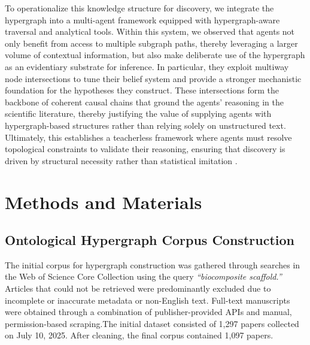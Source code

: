 \documentclass{article}
\begin{document}
To operationalize this knowledge structure for discovery, we integrate the hypergraph into a multi-agent framework equipped with hypergraph-aware traversal and analytical tools. Within this system, we observed that agents not only benefit from access to multiple subgraph paths, thereby leveraging a larger volume of contextual information, but also make deliberate use of the hypergraph as an evidentiary substrate for inference. In particular, they exploit multiway node intersections to tune their belief system and provide a stronger mechanistic foundation for the hypotheses they construct. These intersections form the backbone of coherent causal chains that ground the agents’ reasoning in the scientific literature, thereby justifying the value of supplying agents with hypergraph-based structures rather than relying solely on unstructured text. Ultimately, this establishes a teacherless framework where agents must resolve topological constraints to validate their reasoning, ensuring that discovery is driven by structural necessity rather than statistical imitation \cite{buehler2025selectiveimperfectiongenerativeframework}.


\section{Methods and Materials}\label{sec6}
\subsection{Ontological Hypergraph Corpus Construction}

The initial corpus for hypergraph construction was gathered through searches in the Web of Science Core Collection \cite{clarivate2025} using the query \emph{“biocomposite scaffold.”} Articles that could not be retrieved were predominantly excluded due to incomplete or inaccurate metadata or non-English text. Full-text manuscripts were obtained through a combination of publisher-provided APIs and manual, permission-based scraping.The initial dataset consisted of 1,297 papers collected on July 10, 2025. After cleaning, the final corpus contained 1,097 papers.
\end{document}
